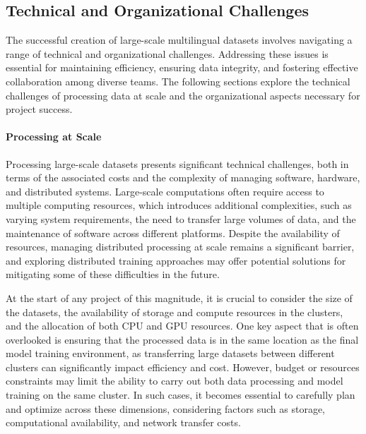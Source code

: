 \subsection{Technical and Organizational Challenges}
\label{sec:insights.organization}

The successful creation of large-scale multilingual datasets involves 
navigating a range of technical and organizational challenges. Addressing 
these issues is essential for maintaining efficiency, ensuring data integrity, 
and fostering effective collaboration among diverse teams. The following 
sections explore the technical challenges of processing data at scale and 
the organizational aspects necessary for project success.



\paragraph{Processing at Scale}

Processing large-scale datasets presents significant technical challenges, 
both in terms of the associated costs and the complexity of managing software, 
hardware, and distributed systems. Large-scale computations often require access 
to multiple computing resources, which introduces additional complexities, 
such as varying system requirements, the need to transfer large volumes of 
data, and the maintenance of software across different platforms. Despite 
the availability of resources, managing distributed processing at scale 
remains a significant barrier, and exploring distributed training approaches 
may offer potential solutions for mitigating some of these difficulties in 
the future.

At the start of any project of this magnitude, it is crucial to consider the 
size of the datasets, the availability of storage and compute resources in 
the clusters, and the allocation of both CPU and GPU resources. One key 
aspect that is often overlooked is ensuring that the processed data is in 
the same location as the final model training environment, as transferring 
large datasets between different clusters can significantly impact efficiency 
and cost. However, budget or resources constraints may limit the ability to 
carry out both data processing and model training on the same cluster. In 
such cases, it becomes essential to carefully plan and optimize across these 
dimensions, considering factors such as storage, computational availability, 
and network transfer costs.



